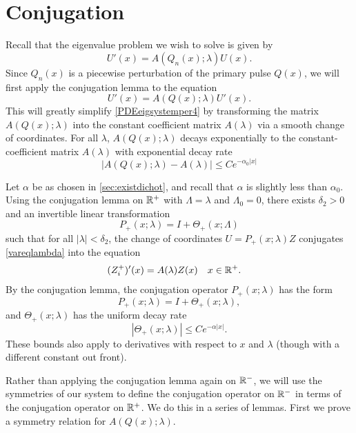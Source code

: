 \documentclass[thesis.tex]{subfiles}
\begin{document}
\section{Conjugation}\label{sec:conjugation}

Recall that the eigenvalue problem we wish to solve is given by
\begin{equation*}
U'(x) = A(Q_n(x); \lambda) U(x).
\end{equation*}
Since $Q_n(x)$ is a piecewise perturbation of the primary pulse $Q(x)$, we will first apply the conjugation lemma to the equation
\begin{equation}\label{vareqlambda}
U'(x) = A(Q(x); \lambda) U'(x).
\end{equation}
This will greatly simplify \cref{PDEeigsystemper4} by transforming the matrix $A(Q(x); \lambda)$ into the constant coefficient matrix $A(\lambda)$ via a smooth change of coordinates. For all $\lambda$, $A(Q(x); \lambda)$ decays exponentially to the constant-coefficient matrix $A(\lambda)$ with exponential decay rate
\[
|A(Q(x); \lambda) - A(\lambda)| \leq C e^{-\alpha_0 |x|}
\]

Let $\alpha$ be as chosen in \cref{sec:existdichot}, and recall that $\alpha$ is slightly less than $\alpha_0$. Using the conjugation lemma on $\mathbb{R}^+$ with $\Lambda = \lambda$ and $\Lambda_0 = 0$, there exists $\delta_2 > 0$ and an invertible linear transformation 
\[
P_+(x; \lambda) = I + \Theta_+(x; \Lambda)
\]
such that for all $|\lambda| < \delta_2$, the change of coordinates $U = P_+(x; \lambda) Z$ conjugates \eqref{vareqlambda} into the equation
\begin{align*}\label{Zplus1}
(Z_i^+)'(x) &= A(\lambda) Z(x) && x \in \mathbb{R}^+.
\end{align*}
By the conjugation lemma, the conjugation operator $P_+(x; \lambda)$ has the form
\begin{equation}\label{projTheta}
P_+(x; \lambda) = I + \Theta_+(x; \lambda),
\end{equation}
and $\Theta_+(x; \lambda)$ has the uniform decay rate
\begin{equation}\label{Thetadecay}
|\Theta_+(x; \lambda)| \leq C e^{-\alpha |x|}.
\end{equation}
These bounds also apply to derivatives with respect to $x$ and $\lambda$ (though with a different constant out front).

Rather than applying the conjugation lemma again on $\mathbb{R}^-$, we will use the symmetries of our system to define the conjugation operator on $\mathbb{R}^-$ in terms of the conjugation operator on $\mathbb{R}^+$. We do this in a series of lemmas. First we prove a symmetry relation for $A(Q(x); \lambda)$.
\end{document}
